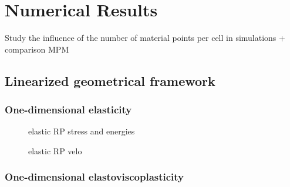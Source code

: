 \chapter{Numerical Results}
Study the influence of the number of material points per cell in simulations + comparison MPM
\section{Linearized geometrical framework}


\subsection{One-dimensional elasticity}
\begin{figure}[h!]
  \centering
  {}
  {}
  {}
  \caption{elastic RP stress and energies}
  \label{fig:stress_elastic_RP}
\end{figure}
\begin{figure}[h!]
  \centering
  {}
  {}
 \caption{elastic RP velo}
  \label{fig:velo_elastic_RP}
\end{figure}

\subsection{One-dimensional elastoviscoplasticity}
